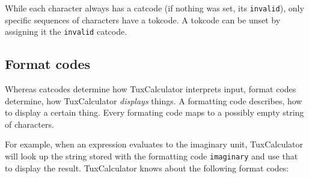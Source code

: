 \documentclass[10pt]{article}
\begin{document}
    While each character always has a catcode (if nothing was set, its \verb|invalid|), only specific sequences of characters have a tokcode.
    A tokcode can be unset by assigning it the \verb|invalid| catcode.

    \subsection{Format codes}\label{subsec:format-codes}
    Whereas catcodes determine how TuxCalculator interprets input, format codes determine, how TuxCalculator \textit{displays} things.
    A formatting code describes, how to display a certain thing.
    Every formating code maps to a possibly empty string of characters.
    
    For example, when an expression evaluates to the imaginary unit, TuxCalculator will look up the string stored with the formatting code \verb|imaginary| and use that to display the result.
    TuxCalculator knows about the following format codes:
\end{document}
